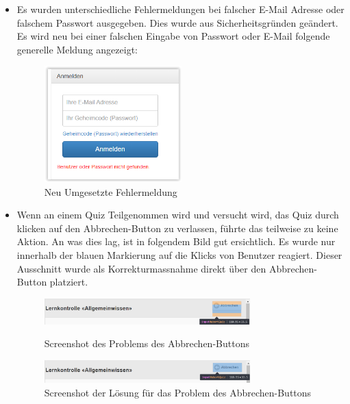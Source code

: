 \begin{itemize}
	\item Es wurden unterschiedliche Fehlermeldungen bei falscher E-Mail Adresse oder falschem Passwort ausgegeben. Dies wurde aus Sicherheitsgründen geändert. Es wird neu bei einer falschen Eingabe von Passwort oder E-Mail folgende generelle Meldung angezeigt:	
	\begin{figure}[H]
		\centering
		\includegraphics[width=0.5\textwidth]
		{Images/nachher_Email-und-Passwort.PNG}
		\caption{Neu Umgesetzte Fehlermeldung}
	\end{figure}

	\item Wenn an einem Quiz Teilgenommen wird und versucht wird, das Quiz durch klicken auf den Abbrechen-Button zu verlassen, führte das teilweise zu keine Aktion. An was dies lag, ist in folgendem Bild gut ersichtlich. Es wurde nur innerhalb der blauen Markierung auf die Klicks von Benutzer reagiert. Dieser Ausschnitt wurde als Korrekturmassnahme direkt über den Abbrechen-Button platziert.
	\begin{figure}[H]
		\centering
		\includegraphics[width=0.75\textwidth]
		{Images/CancelButtonProblem.PNG}
		\caption{Screenshot des Problems des Abbrechen-Buttons}
		\cite{mobilequiz.ch}
	\end{figure}
	
	\begin{figure}[H]
		\centering
		\includegraphics[width=0.75\textwidth]
		{Images/CancelButtonFix.PNG}
		\caption{Screenshot der Lösung für das Problem des Abbrechen-Buttons}
	\end{figure}
	

\end{itemize}
